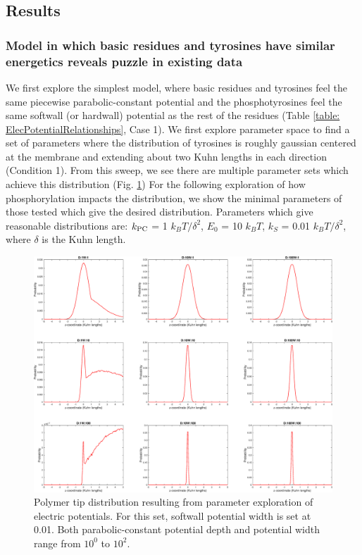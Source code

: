\documentclass[../../AdvancementSummary.tex]{subfiles}
\begin{document}
\subsection{Results}
\subsubsection{Model in which basic residues and tyrosines have similar energetics reveals puzzle in existing data}

We first explore the simplest model, where basic residues and tyrosines feel the same piecewise parabolic-constant potential and the phosphotyrosines feel the same softwall (or hardwall) potential as the rest of the residues (Table \ref{table: ElecPotentialRelationships}, Case 1). We first explore parameter space to find a set of parameters where the distribution of tyrosines is roughly gaussian centered at the membrane and extending about two Kuhn lengths in each direction (Condition 1). From this sweep, we see there are multiple parameter sets which achieve this distribution (Fig. \ref{fig: iSiteDistInitial}) For the following exploration of how phosphorylation impacts the distribution, we show the minimal parameters of those tested which give the desired distribution. Parameters which give reasonable distributions are: $k_{\rm{PC}}$ = 1 $k_BT/\delta^2$, $E_0$ = 10 $k_BT$, $k_S$ = 0.01 $k_BT/\delta^2$, where $\delta$ is the Kuhn length.


\begin{figure}[H]
\begin{center}
\includegraphics[width=0.8\linewidth]{ResultsFigures/CD3ZetaSoftwallPiecewiseBasicsY/DistributioniSite7.eps}
\end{center}
\caption{Polymer tip distribution resulting from parameter exploration of electric potentials. For this set, softwall potential width is set at 0.01. Both parabolic-constant potential depth and potential width range from $10^0$ to $10^{2}$.\label{fig: iSiteDistInitial}}
\end{figure}
\end{document}
